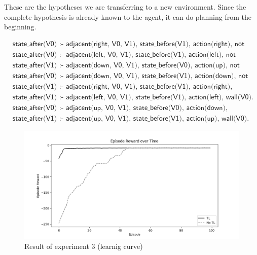 These are the hypotheses we are transferring to a new environment.
Since the complete hypothesis is already known to the agent, it can do planning from the beginning.

\begin{equation}
\begin{split}
 &\textsf{state\_after(V0) :- adjacent(right, V0, V1), state\_before(V1), action(right), not wall(V0).}\\
 &\textsf{state\_after(V0) :- adjacent(left, V0, V1), state\_before(V1), action(left), not wall(V0).}\\
 &\textsf{state\_after(V1) :- adjacent(down, V0, V1), state\_before(V0), action(up), not wall(V1).}\\
 &\textsf{state\_after(V0) :- adjacent(down, V0, V1), state\_before(V1), action(down), not wall(V0).}\\
 &\textsf{state\_after(V1) :- adjacent(right, V0, V1), state\_before(V1), action(right), wall(V0).}\\
 &\textsf{state\_after(V1) :- adjacent(left, V0, V1), state\_before(V1), action(left), wall(V0).}\\
 &\textsf{state\_after(V0) :- adjacent(up, V0, V1), state\_before(V0), action(down), wall(V1).}\\
 &\textsf{state\_after(V1) :- adjacent(up, V0, V1), state\_before(V1), action(up), wall(V0).}
\end{split}
\end{equation}

\begin{figure}[!htb]
\centering
\includegraphics[width=1.0\textwidth]{./figures/experiment4_after_training}
\caption{Result of experiment 3 (learnig curve)}
\label{experiment3_training}
\end{figure}

